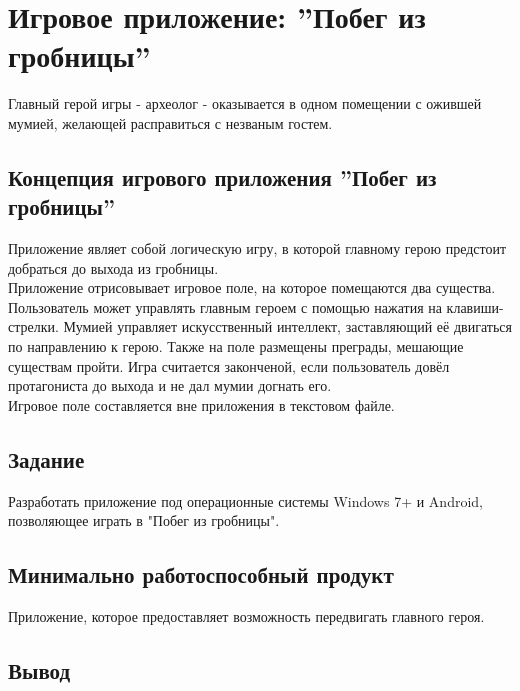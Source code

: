 \documentclass[a4paper]{article}
\begin{document}
\vfill %
\tableofcontents
\newpage

\section{Игровое приложение: ''Побег из гробницы''}

Главный герой игры - археолог - оказывается в одном помещении с ожившей мумией, желающей расправиться с незваным гостем.\\



\subsection{Концепция игрового приложения ''Побег из гробницы''}

Приложение являет собой логическую игру, в которой главному герою предстоит добраться до выхода из гробницы.\\

Приложение отрисовывает игровое поле, на которое помещаются два существа. Пользователь может управлять главным героем с помощью нажатия на клавиши-стрелки. Мумией управляет искусственный интеллект, заставляющий её двигаться по направлению к герою. Также на поле размещены преграды, мешающие существам пройти. Игра считается законченой, если пользователь довёл протагониста до выхода и не дал мумии догнать его.\\
Игровое поле составляется вне приложения в текстовом файле.\\

\subsection{Задание}

Разработать приложение под операционные системы Windows 7+ и Android, позволяющее играть в "Побег из гробницы". 

\subsection{Минимально работоспособный продукт}

Приложение, которое предоставляет возможность передвигать главного героя.

\subsection{Вывод}
\end{document}
